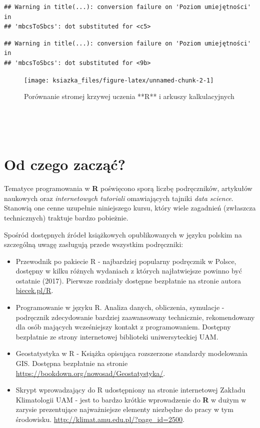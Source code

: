 \documentclass[]{book}
\providecommand{\tightlist}{%
  \setlength{\itemsep}{0pt}\setlength{\parskip}{0pt}}
\theoremstyle{definition}
\theoremstyle{definition}
\theoremstyle{definition}
\theoremstyle{remark}
\begin{document}
\begin{verbatim}
## Warning in title(...): conversion failure on 'Poziom umiejętności' in
## 'mbcsToSbcs': dot substituted for <c5>
\end{verbatim}

\begin{verbatim}
## Warning in title(...): conversion failure on 'Poziom umiejętności' in
## 'mbcsToSbcs': dot substituted for <9b>
\end{verbatim}

\begin{figure}

{\centering \texttt{[image: ksiazka\_files/figure-latex/unnamed-chunk-2-1]} 

}

\caption{Porównanie stromej krzywej uczenia **R** i arkuszy kalkulacyjnych}\label{fig:unnamed-chunk-2}
\end{figure}

~

~

\section{Od czego zacząć?}\label{od-czego-zaczac}

Tematyce programowania w \textbf{R} poświęcono sporą liczbę
podręczników, artykułów naukowych oraz \emph{internetowych tutoriali}
omawiających tajniki \emph{data science}. Stanowią one cenne uzupełnie
niniejszego kursu, który wiele zagadnień (zwłaszcza technicznych)
traktuje bardzo pobieżnie.

Spośród dostępnych źródeł książkowych opublikowanych w języku polskim na
szczególną uwagę zasługują przede wszystkim podręczniki:

\begin{itemize}
\tightlist
\item
  Przewodnik po pakiecie R \citep{biecek2008} - najbardziej popularny
  podręcznik w Polsce, dostępny w kilku różnych wydaniach z których
  najłatwiejsze powinno być ostatnie (2017). Pierwsze rozdziały dostępne
  bezpłatnie na stronie autora \href{www.biecek.pl/R}{biecek.pl/R}.
\item
  Programowanie w języku R. Analiza danych, obliczenia, symulacje
  \citep{gagolewski2016} - podręcznik zdecydowanie bardziej zaawansowany
  technicznie, rekomendowany dla osób mających wcześniejszy kontakt z
  programowaniem. Dostępny bezpłatnie ze strony internetowej biblioteki
  uniwersyteckiej UAM.
\item
  Geostatystyka w R \citep{nowosad2016} - Książka opisująca rozszerzone
  standardy modelowania GIS. Dostępna bezpłatnie na stronie
  \url{https://bookdown.org/nowosad/Geostatystyka/}.
\item
  Skrypt wprowadzający do R udostępniony na stronie internetowej Zakładu
  Klimatologii UAM - jest to bardzo krótkie wprowadzenie do \textbf{R} w
  dużym w zarysie prezentujące najważniejsze elementy niezbędne do pracy
  w tym środowisku. \url{http://klimat.amu.edu.pl/?page_id=2500}.
\end{itemize}
\end{document}
